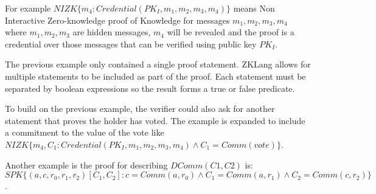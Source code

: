 \documentclass[a4paper]{article}
\begin{document}
For example $NIZK\{m_4: Credential(PK_I, m_1, m_2, m_3, m_4)\}$ means Non Interactive Zero-knowledge proof of Knowledge for messages $m_1, m_2, m_3, m_4$ where $m_1, m_2, m_3$ are hidden messages, $m_4$ will be revealed and the proof is a credential over those messages that can be verified using public key $PK_I$.

The previous example only contained a single proof statement. ZKLang allows for multiple statements to be included as part of the proof. Each statement must be separated by boolean expressions so the result forms a true or false predicate.

To build on the previous example, the verifier could also ask for another statement that proves the holder has voted. The example is expanded to include a commitment to the value of the vote like $NIZK\{m_4, C_1: Credential(PK_I, m_1, m_2, m_3, m_4) \wedge C_1=Comm(vote)\}$.

Another example is the proof for describing $DComm(C1, C2)$ is: $SPK\{(a, c, r_0, r_1, r_2)[C_1, C_2]: c=Comm(a, r_0) \wedge C_1 = Comm(a, r_1) \wedge C_2 = Comm(c, r_2)\}$. \newline



\end{document}
